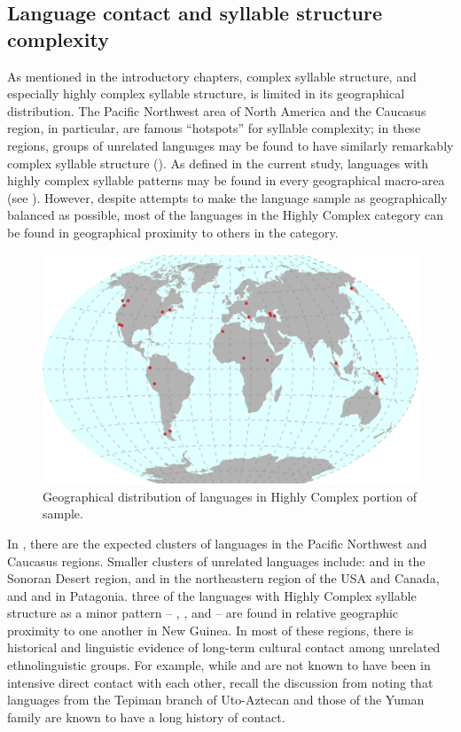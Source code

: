 \subsection{Language contact and syllable structure complexity}\label{sec:8.4.5}

  As mentioned in the introductory chapters, complex syllable structure, and especially highly complex syllable structure, is limited in its geographical distribution. The Pacific Northwest area of North America and the Caucasus region, in particular, are famous ``hotspots'' for syllable complexity; in these regions, groups of unrelated languages may be found to have similarly remarkably complex syllable structure (\citealt{Chirikba2008,ThompsonKinkade1990}). As defined in the current study, languages with highly complex syllable patterns may be found in every geographical macro-area (see ). However, despite attempts to make the language sample as geographically balanced as possible, most of the languages in the Highly Complex category can be found in geographical proximity to others in the category.

  
\begin{figure}
\includegraphics[width=\textwidth]{figures/fig81.png}
\caption{\label{fig:8.1}Geographical distribution of languages in Highly Complex portion of sample.}
\end{figure}

  In , there are the expected clusters of languages in the Pacific Northwest and Caucasus regions. Smaller clusters of unrelated languages include:  and  in the Sonoran Desert region,  and  in the northeastern region of the USA and Canada, and  and  in Patagonia.  three of the languages with Highly Complex syllable structure as a minor pattern -- , , and  -- are found in relative geographic proximity to one another in New Guinea. In most of these regions, there is historical and linguistic evidence of long-term cultural contact among unrelated ethnolinguistic groups. For example, while  and  are not known to have been in intensive direct contact with each other, recall the discussion from  noting that languages from the Tepiman branch of Uto-Aztecan and those of the Yuman family are known to have a long history of contact. 

